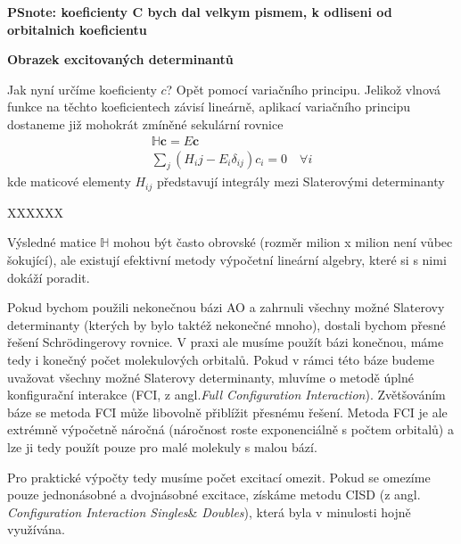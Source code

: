 \textbf{PSnote: koeficienty C bych dal velkym pismem, k odliseni od orbitalnich koeficientu}

\bigskip

\textbf{Obrazek excitovaných determinantů}

\bigskip

Jak nyní určíme koeficienty $c$? Opět pomocí variačního principu. Jelikož vlnová funkce na těchto koeficientech závisí lineárně, aplikací variačního principu dostaneme již mohokrát zmíněné sekulární rovnice
\begin{eqnarray}
\mathbb{H}\mathbf{c}=E\mathbf{c} \nonumber \\
\sum_j (H_ij-E_i\delta_{ij})c_i=0 \quad \forall i
\end{eqnarray}
kde maticové elementy $H_{ij}$ představují integrály mezi Slaterovými determinanty

 
XXXXXX

Výsledné matice $\mathbb{H}$ mohou být často obrovské (rozměr milion x milion není vůbec šokující), ale existují efektivní metody výpočetní lineární algebry, které si s nimi dokáží poradit.

Pokud bychom použili nekonečnou bázi AO a zahrnuli všechny možné Slaterovy determinanty (kterých by bylo taktéž nekonečné mnoho), dostali bychom přesné řešení Schr\"{o}dingerovy rovnice. V praxi ale musíme použít bázi konečnou, máme tedy i konečný počet molekulových orbitalů. Pokud v rámci této báze budeme uvažovat všechny možné Slaterovy determinanty, mluvíme o metodě úplné konfigurační interakce (FCI, z angl.\textit{Full Configuration Interaction}). Zvětšováním báze se metoda FCI může libovolně přiblížit přesnému řešení. Metoda FCI je ale extrémně výpočetně náročná (náročnost roste exponenciálně s počtem orbitalů) a lze ji tedy použít pouze pro malé molekuly s malou bází.

Pro praktické výpočty tedy musíme počet excitací omezit. Pokud se omezíme pouze jednonásobné a dvojnásobné excitace, získáme metodu CISD (z angl. \textit{Configuration Interaction Singles}\& \textit{Doubles}), která byla v minulosti hojně využívána.

